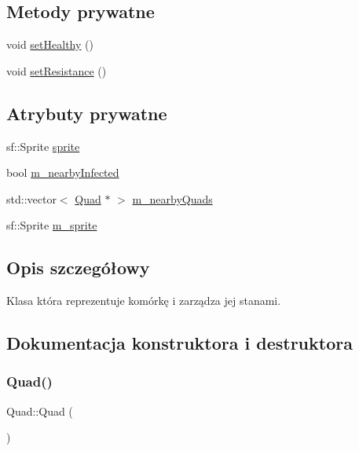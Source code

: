 \subsection*{Metody prywatne}
\begin{DoxyCompactItemize}
\item 
void \mbox{\hyperlink{class_quad_a3b6d55ec11182c7151bb3894ab397204}{set\+Healthy}} ()
\item 
void \mbox{\hyperlink{class_quad_a92ac7d4d3d789cce9339eadc77fd8185}{set\+Resistance}} ()
\end{DoxyCompactItemize}
\subsection*{Atrybuty prywatne}
\begin{DoxyCompactItemize}
\item 
sf\+::\+Sprite \mbox{\hyperlink{class_quad_a83667bb824c1d6eca6c9c8b6e6d07d06}{sprite}}
\item 
bool \mbox{\hyperlink{class_quad_a6ccb745d5e70603957948d681b60e0f8}{m\+\_\+nearby\+Infected}}
\item 
std\+::vector$<$ \mbox{\hyperlink{class_quad}{Quad}} $\ast$ $>$ \mbox{\hyperlink{class_quad_ad66d1a97fdbecb53ea43af7361b4f124}{m\+\_\+nearby\+Quads}}
\item 
sf\+::\+Sprite \mbox{\hyperlink{class_quad_a6f4ba6ebde2332f1c4b34661089550e5}{m\+\_\+sprite}}
\end{DoxyCompactItemize}


\subsection{Opis szczegółowy}
Klasa która reprezentuje komórkę i zarządza jej stanami. 

\subsection{Dokumentacja konstruktora i destruktora}
\mbox{\label{class_quad_ae446d188d645cc5c512336f25d1a697a}} 
\subsubsection{\texorpdfstring{Quad()}{Quad()}}
{\footnotesize\ttfamily Quad\+::\+Quad (\begin{DoxyParamCaption}{ }\end{DoxyParamCaption})}

